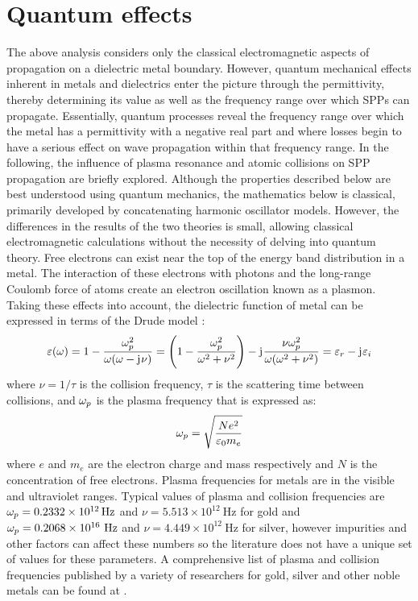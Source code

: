 \documentclass[11pt]{article}
\begin{document}
\section{Quantum effects}
%
The above analysis considers only the classical electromagnetic aspects of propagation on a dielectric metal boundary. However, quantum mechanical effects inherent in metals and dielectrics enter the picture through the permittivity, thereby determining its value as well as the frequency range over which SPPs can propagate. Essentially, quantum processes reveal the frequency range over which the metal has a permittivity with a negative real part and where losses begin to have a serious effect on wave propagation within that frequency range. In the following, the influence of plasma resonance and atomic collisions on SPP propagation are briefly explored.  Although the properties described below are best understood using quantum mechanics, the mathematics below is classical, primarily developed by concatenating harmonic oscillator models. However, the differences in the results of the two theories is small, allowing classical electromagnetic calculations without the necessity of delving into quantum theory.
Free electrons can exist near the top of the energy band distribution in a metal. The interaction of these electrons with photons and the long-range Coulomb force of atoms create an electron oscillation known as a plasmon. Taking these effects into account, the dielectric function of metal can be expressed in terms of the Drude model \cite{MaxBorn2002}:
%
\begin{equation}
  \varepsilon(\omega) = 1 - \frac{\omega_p^2}{\omega(\omega  - \mathrm{j}\mkern1mu \nu)} = \left(1 - \frac{\omega_p^2}{\omega^2 + \nu^2} \right) - \mathrm{j}\mkern1mu \frac{\nu \omega_p^2}{\omega (\omega^2 + \nu^2)} = \varepsilon_r - \mathrm{j}\mkern1mu \varepsilon_i
  \label{eq:drude}
\end{equation}
%
where $\nu = 1/\tau$ is the collision frequency, $\tau$ is the scattering time between collisions, and $\omega_p$ is the plasma frequency that is expressed as:
%
\begin{equation}
  \omega_p = \sqrt{\frac{N e^2}{\varepsilon_0 m_e}}
  \label{eq:plasma_f}
\end{equation}
%
where $e$ and $m_e$ are the electron charge and mass respectively and $N$ is the concentration of free electrons. Plasma frequencies for metals are in the visible and ultraviolet ranges. Typical values of plasma and collision frequencies are $\omega_p = \SI{.2332e12}{\hertz}$ and
$\nu = 5.513 \times 10^{12}~\mathrm{Hz}$ for gold and $\omega_p = 0.2068 \times 10^{16}~\mathrm{Hz}$ and $\nu = 4.449 \times 10^{12}~\mathrm{Hz}$ for silver, however impurities and other factors can affect these numbers so the literature does not have a unique set of values for these parameters. A comprehensive list of plasma and collision frequencies published by a variety of researchers for gold, silver and other noble metals can be found at \cite{Moroz2010}.
\end{document}
